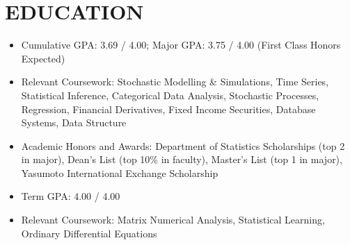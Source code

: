 \documentclass[classic]{resume}
\begin{document}
    \address{Wu Yee Sun College, CUHK, Shatin, N.T., Hong Kong SAR}
    \maketitle
    \section{EDUCATION}

    \begin{itemize}
        \item Cumulative GPA: 3.69 / 4.00; Major GPA: 3.75 / 4.00 (First Class Honors Expected)
        \item Relevant Coursework: Stochastic Modelling \& Simulations, Time Series, Statistical Inference, Categorical Data Analysis, Stochastic Processes, Regression, Financial Derivatives, Fixed Income Securities, Database Systems, Data Structure
        \item Academic Honors and Awards: Department of Statistics Scholarships (top 2 in major), Dean's List (top 10\% in faculty), Master's List (top 1 in major), Yasumoto International Exchange Scholarship
    \end{itemize}

    \begin{itemize}
        \item Term GPA: 4.00 / 4.00
        \item Relevant Coursework: Matrix Numerical Analysis, Statistical Learning, Ordinary Differential Equations
    \end{itemize}
\end{document}
